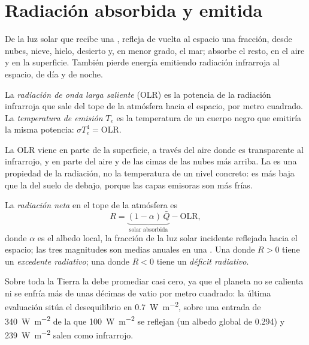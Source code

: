 \section{Radiación absorbida y emitida}\label{sec:b1:radiation-heat-transport:toa}

De la luz solar que recibe una , refleja de vuelta al espacio una fracción, desde nubes, nieve, hielo, desierto y, en menor grado, el mar; absorbe el resto, en el aire y en la superficie. También pierde energía emitiendo radiación infrarroja al espacio, de día y de noche.

\begin{definition}\label{def:b1:radiation-heat-transport:olr}
La \emph{radiación de onda larga saliente} (OLR) es la potencia de la radiación infrarroja que sale del tope de la atmósfera hacia el espacio, por metro cuadrado. La \emph{temperatura de emisión}
$T_e$ es la temperatura de un cuerpo negro que emitiría la misma potencia: $\sigma T_e^4 = \text{OLR}$.
\end{definition}

La OLR viene en parte de la superficie, a través del aire donde es transparente al infrarrojo, y en parte del aire y de las cimas de las nubes más arriba. La  es una propiedad de la radiación, no la temperatura de un nivel concreto: es más baja que la del suelo de debajo, porque las capas emisoras son más frías.

\begin{definition}\label{def:b1:radiation-heat-transport:net-radiation}
La \emph{radiación neta} en el tope de la atmósfera es
\[
  R = \underbrace{(1 - \alpha)\,\bar Q}_{\text{solar absorbida}} - \text{OLR},
\]
donde $\alpha$ es el albedo local, la fracción de la luz solar incidente reflejada
hacia el espacio; las tres magnitudes son medias anuales en una . Una  donde
$R > 0$ tiene un \emph{excedente radiativo}; una donde $R < 0$
tiene un \emph{déficit radiativo}.
\end{definition}

Sobre toda la Tierra la  debe promediar casi cero, ya que el planeta no se calienta ni se enfría más de unas décimas de vatio por metro cuadrado: la última evaluación sitúa el desequilibrio en \qty{0.7}{W.m^{-2}}, sobre una entrada de \qty{340}{W.m^{-2}} de la que \qty{100}{W.m^{-2}} se reflejan (un albedo global de \num{0.294}) y \qty{239}{W.m^{-2}} salen como infrarrojo.

